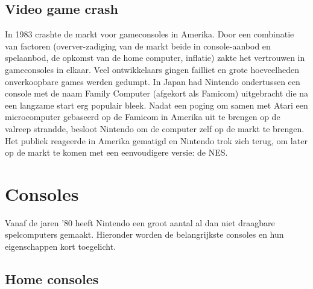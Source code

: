 \documentclass{article}
\begin{document}
\subsection{Video game crash}
In 1983 crashte de markt voor gameconsoles in Amerika. Door een combinatie van factoren (overver-zadiging van de markt beide in console-aanbod en spelaanbod, de opkomst van de home computer, inflatie) zakte het vertrouwen in gameconsoles in elkaar.
Veel ontwikkelaars gingen failliet en grote hoeveelheden onverkoopbare games werden gedumpt. In Japan had Nintendo ondertussen een console met de naam Family Computer (afgekort als Famicom) uitgebracht die na een langzame start erg populair bleek. Nadat een poging om samen met Atari een microcomputer gebaseerd op de Famicom in Amerika uit te brengen op de valreep strandde, besloot Nintendo om de computer zelf op de markt te brengen. Het publiek reageerde in Amerika gematigd en Nintendo trok zich terug, om later op de markt te komen met een eenvoudigere versie: de NES. 

\section{Consoles}
Vanaf de jaren '80 heeft Nintendo een groot aantal al dan niet draagbare spelcomputers gemaakt. Hieronder worden de belangrijkste consoles en hun eigenschappen kort toegelicht. 
\subsection{Home consoles}
\end{document}
